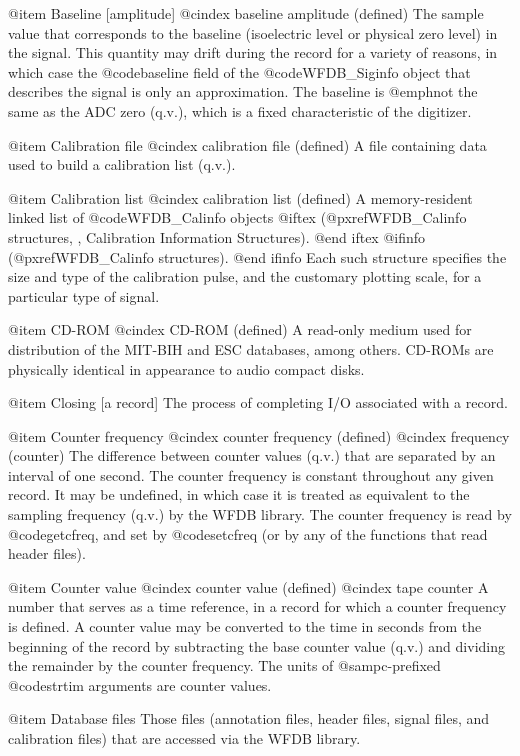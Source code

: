 {{{{{{{{{@item Baseline [amplitude]
@cindex baseline amplitude (defined)
The sample value that corresponds to the baseline (isoelectric level or
physical zero level) in the signal.  This quantity may drift during the
record for a variety of reasons, in which case the @code{baseline} field
of the @code{WFDB_Siginfo} object that describes the signal is only an
approximation.  The baseline is @emph{not} the same as the ADC zero
(q.v.), which is a fixed characteristic of the digitizer.

@item Calibration file
@cindex calibration file (defined)
A file containing data used to build a calibration list (q.v.).

@item Calibration list
@cindex calibration list (defined)
A memory-resident linked list of @code{WFDB_Calinfo} objects
@iftex
(@pxref{WFDB_Calinfo structures, , Calibration Information Structures}).
@end iftex
@ifinfo
(@pxref{WFDB_Calinfo structures}).
@end ifinfo
Each such structure specifies the size and type of the calibration pulse,
and the customary plotting scale, for a particular type of signal.

@item CD-ROM
@cindex CD-ROM (defined)
A read-only medium used for distribution of the MIT-BIH and ESC
databases, among others.  CD-ROMs are physically identical in appearance
to audio compact disks.

@item Closing [a record]
The process of completing I/O associated with a record.

@item Counter frequency
@cindex counter frequency (defined)
@cindex frequency (counter)
The difference between counter values (q.v.) that are separated
by an interval of one second.  The counter frequency is constant
throughout any given record.  It may be undefined, in which case it is
treated as equivalent to the sampling frequency (q.v.) by the WFDB
library.  The counter frequency is read by @code{getcfreq},
and set by @code{setcfreq} (or by any of the functions that read
header files).

@item Counter value
@cindex counter value (defined)
@cindex tape counter
A number that serves as a time reference, in a record for which a
counter frequency is defined.  A counter value may be converted to the
time in seconds from the beginning of the record by subtracting the base
counter value (q.v.) and dividing the remainder by the counter
frequency.  The units of @samp{c}-prefixed @code{strtim} arguments are
counter values.

@item Database files
Those files (annotation files, header files, signal files, and
calibration files) that are accessed via the WFDB library.

}}}}}}}}}
